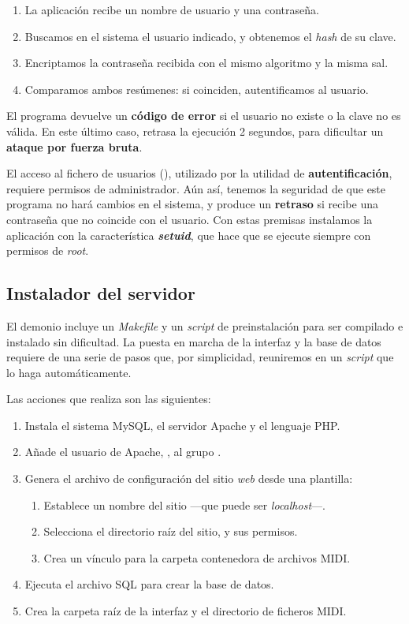 \begin{enumerate}
	\item La aplicación recibe un nombre de usuario y una contraseña.
	\item Buscamos en el sistema el usuario indicado, y obtenemos el \textit{hash} de su clave.
	\item Encriptamos la contraseña recibida con el mismo algoritmo y la misma sal.
	\item Comparamos ambos resúmenes: si coinciden, autentificamos al usuario.
\end{enumerate}

El programa devuelve un \textbf{código de error} si el usuario no existe o la clave no es válida. En este último caso, retrasa la ejecución 2 segundos, para dificultar un \textbf{ataque por fuerza bruta}.

El acceso al fichero de usuarios (), utilizado por la utilidad de \textbf{autentificación}, requiere permisos de administrador. Aún así, tenemos la seguridad de que este programa no hará cambios en el sistema, y produce un \textbf{retraso} si recibe una contraseña que no coincide con el usuario. Con estas premisas instalamos la aplicación con la característica \textbf{\textit{setuid}}, que hace que se ejecute siempre con permisos de \textit{root}.

\subsection{Instalador del servidor}

El demonio incluye un \textit{Makefile} y un \textit{script} de preinstalación para ser compilado e instalado sin dificultad. La puesta en marcha de la interfaz y la base de datos requiere de una serie de pasos que, por simplicidad, reuniremos en un \textit{script} que lo haga automáticamente.

Las acciones que realiza son las siguientes:

\begin{enumerate}
	\item Instala el sistema MySQL, el servidor Apache y el lenguaje \acrshort{PHP}.
	\item Añade el usuario de Apache, , al grupo .
	\item Genera el archivo de configuración del sitio \textit{web} desde una plantilla:
	
	\begin{enumerate}
		\item Establece un nombre del sitio ---que puede ser \textit{localhost}---.
		\item Selecciona el directorio raíz del sitio, y sus permisos.
		\item Crea un vínculo para la carpeta contenedora de archivos \acrshort{MIDI}.
	\end{enumerate}
	
	\item Ejecuta el archivo \acrshort{SQL} para crear la base de datos.
	\item Crea la carpeta raíz de la interfaz y el directorio de ficheros \acrshort{MIDI}.
\end{enumerate}

